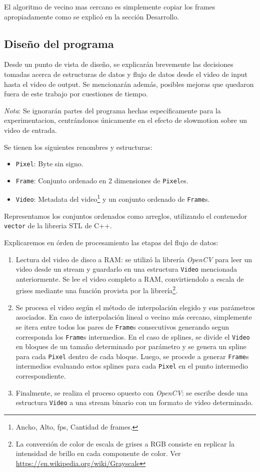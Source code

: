El algoritmo de vecino mas cercano es simplemente copiar los frames apropiadamente como se explicó en la sección Desarrollo.

\subsection{Diseño del programa}
Desde un punto de vista de diseño, se explicarán brevemente las decisiones tomadas acerca de estructuras de datos y flujo de datos desde el video de input hasta el video de output. Se mencionarán además, posibles mejoras que quedaron fuera de este trabajo por cuestiones de tiempo.

\emph{Nota}: Se ignorarán partes del programa hechas específicamente para la experimentacion, centrándonos únicamente en el efecto de slowmotion sobre un video de entrada.

Se tienen los siguientes renombres y estructuras:
\begin{itemize}
	\item \texttt{Pixel}: Byte sin signo.
	\item \texttt{Frame}: Conjunto ordenado en 2 dimensiones de \texttt{Pixel}es.
	\item \texttt{Video}: Metadata del video\footnote{Ancho, Alto, fps, Cantidad de frames.} y un conjunto ordenado de \texttt{Frame}s.
\end{itemize}

Representamos los conjuntos ordenados como arreglos, utilizando el contenedor \texttt{vector} de la libreria STL de C++.

Explicaremos en órden de procesamiento las etapas del flujo de datos:
\begin{enumerate}
	\item Lectura del video de disco a RAM: se utilizó la librería \emph{OpenCV} para leer un video desde un stream y guardarlo en una estructura \texttt{Video} mencionada anteriormente. Se lee el video completo a RAM, convirtiendolo a escala de grises mediante una función provista por la librería\footnote{La conversión de color de escala de grises a RGB consiste en replicar la intensidad de brillo en cada componente de color. Ver \url{https://en.wikipedia.org/wiki/Grayscale}}.
	\item Se procesa el video según el método de interpolación elegido y sus parámetros asociados. En caso de interpolación lineal o vecino más cercano, simplemente se itera entre todos los pares de \texttt{Frame}s consecutivos generando segun corresponda los \texttt{Frame}s intermedios. En el caso de splines, se divide el \texttt{Video} en bloques de un tamaño determinado por parámetro y se genera un spline para cada \texttt{Pixel} dentro de cada bloque. Luego, se procede a generar \texttt{Frame}s intermedios evaluando estos splines para cada \texttt{Pixel} en el punto intermedio correspondiente.
	\item Finalmente, se realiza el proceso opuesto con \emph{OpenCV}: se escribe desde una estructura \texttt{Video} a una stream binario con un formato de video determinado.
\end{enumerate}

